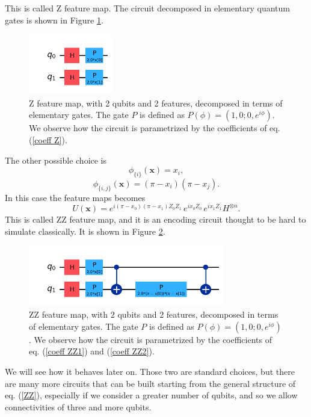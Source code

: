 \documentclass[12pt]{article}
\begin{document}
\begin{itemize}
    This is called Z feature map. The circuit decomposed in elementary quantum gates is shown in Figure \ref{fig:Z}. 
    \begin{figure}[h!]
        \centering
        \includegraphics[height=100px]{images/Z.png}
        \caption{Z feature map, with 2 qubits and 2 features, decomposed in terms of elementary gates. The gate $P$ is defined as $P(\phi) = (1,0; 0, e^{i\phi})$. We observe how the circuit is parametrized by the coefficients of eq. (\ref{coeff Z}).}
        \label{fig:Z}
    \end{figure}
    The other possible choice is  
    \begin{equation}
        \phi_{\{i\}}(\mathbf{x})=x_i,
        \label{coeff ZZ1}
    \end{equation}
    \begin{equation}
        \phi_{\{i,j\}}(\mathbf{x})=(\pi-x_i)(\pi-x_j).
        \label{coeff ZZ2}
    \end{equation}
    In this case the feature maps becomes 
    \begin{equation}
        {U}(\mathbf{x})=e^{i(\pi-x_0)(\pi-x_1)Z_0Z_1}\,e^{ix_0Z_0}\,e^{ix_1Z_1}H^{\otimes n}.
    \end{equation}
    This is called ZZ feature map, and it is an encoding circuit thought to be hard to simulate classically. It is shown in Figure \ref{fig:ZZ}. 
    \begin{figure}[h!]
        \centering
        \includegraphics[height=100px]{images/ZZ.png}
        \caption{ZZ feature map, with 2 qubits and 2 features, decomposed in terms of elementary gates. The gate $P$ is defined as $P(\phi) = (1,0; 0, e^{i\phi})$. We observe how the circuit is parametrized by the coefficients of eq. (\ref{coeff ZZ1}) and (\ref{coeff ZZ2}).}
        \label{fig:ZZ}
    \end{figure}
    We will see how it behaves later on. Those two are standard choices, but there are many more circuits that can be built starting from the general structure of eq. (\ref{ZZ}), especially if we consider a greater number of qubits, and so we allow connectivities of three and more qubits. 

\end{itemize}
\end{document}

